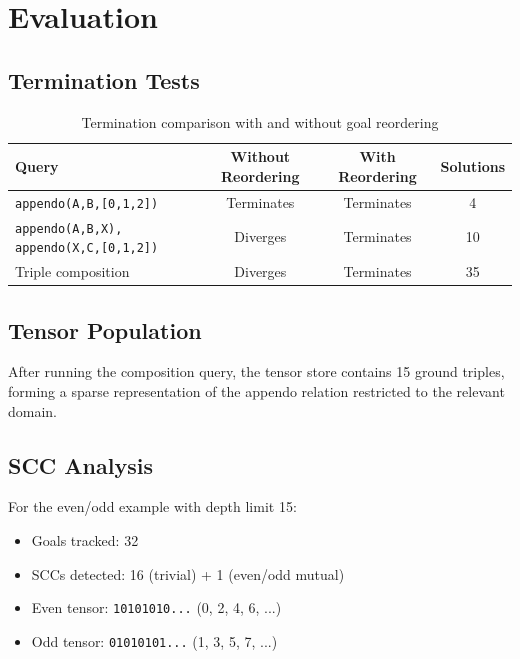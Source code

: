\documentclass[11pt,a4paper]{article}
\begin{document}
\section{Evaluation}
\label{sec:evaluation_chirho}

\subsection{Termination Tests}
\label{subsec:termination_tests_chirho}

\begin{table}[h]
\centering
\begin{tabular}{lccc}
\toprule
Query & Without Reordering & With Reordering & Solutions \\
\midrule
\texttt{appendo(A,B,[0,1,2])} & Terminates & Terminates & 4 \\
\texttt{appendo(A,B,X), appendo(X,C,[0,1,2])} & Diverges & Terminates & 10 \\
Triple composition & Diverges & Terminates & 35 \\
\bottomrule
\end{tabular}
\caption{Termination comparison with and without goal reordering}
\label{tab:termination_chirho}
\end{table}

\subsection{Tensor Population}
\label{subsec:tensor_pop_chirho}

After running the composition query, the tensor store contains 15 ground
triples, forming a sparse representation of the appendo relation restricted
to the relevant domain.

\subsection{SCC Analysis}
\label{subsec:scc_analysis_chirho}

For the even/odd example with depth limit 15:
\begin{itemize}
  \item Goals tracked: 32
  \item SCCs detected: 16 (trivial) + 1 (even/odd mutual)
  \item Even tensor: \texttt{10101010...} (0, 2, 4, 6, ...)
  \item Odd tensor: \texttt{01010101...} (1, 3, 5, 7, ...)
\end{itemize}
\end{document}
